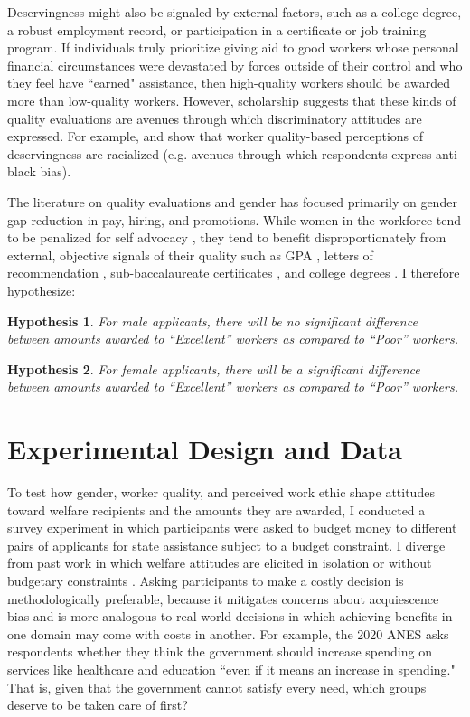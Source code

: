 \documentclass[12pt]{article}%
\newtheorem{hypothesis}{Hypothesis}
\begin{document}
\begin{doublespace}
Deservingness might also be signaled by external factors, such as a college degree, a robust employment record, or participation in a certificate or job training program. If individuals truly prioritize giving aid to good workers whose personal financial circumstances were devastated by forces outside of their control and who they feel have ``earned" assistance, then high-quality workers should be awarded more than low-quality workers. However, scholarship suggests that these kinds of quality evaluations are avenues through which discriminatory attitudes are expressed. For example, \cite{gilens_why_2000} and \cite{desante_working_2013} show that worker quality-based perceptions of deservingness are racialized (e.g. avenues through which respondents express anti-black bias).

The literature on quality evaluations and gender has focused primarily on gender gap reduction in pay, hiring, and promotions. While women in the workforce tend to be penalized for self advocacy \citep{quadlin_market, exley2020knowing}, they tend to benefit disproportionately from external, objective signals of their quality such as GPA \citep{quadlin2018mark}, letters of recommendation \citep{abel_value_2020}, sub-baccalaureate certificates  \citep{dadgar_labor_2015}, and college degrees \citep{jepsen_labor-market_2014}. I therefore hypothesize:


\begin{hypothesis} \label{hyp:thirda}
	For male applicants, there will be no significant difference between amounts awarded to ``Excellent” workers as compared to ``Poor” workers.
\end{hypothesis}

\begin{hypothesis} \label{hyp:thirdb}
	For female applicants, there will be a significant difference between amounts awarded to ``Excellent” workers as compared to ``Poor” workers.
\end{hypothesis}


\section*{Experimental Design and Data}
To test how gender, worker quality, and perceived work ethic shape attitudes toward welfare recipients and the amounts they are awarded, I conducted a survey experiment in which participants were asked to budget money to different pairs of applicants for state assistance subject to a budget constraint. I diverge from past work in which welfare attitudes are elicited in isolation or without budgetary constraints \citep{rabinowitz2009white, aaroe2014crowding, sniderman1993scar, cassese2019intersectional}. Asking participants to make a costly decision is methodologically preferable, because it mitigates concerns about acquiescence bias and is more analogous to real-world decisions in which achieving benefits in one domain may come with costs in another. For example, the 2020 ANES asks respondents whether they think the government should increase spending on services like healthcare and education ``even if it means an increase in spending." That is, given that the government cannot satisfy every need, which groups deserve to be taken care of first?


\end{doublespace}
\end{document}

